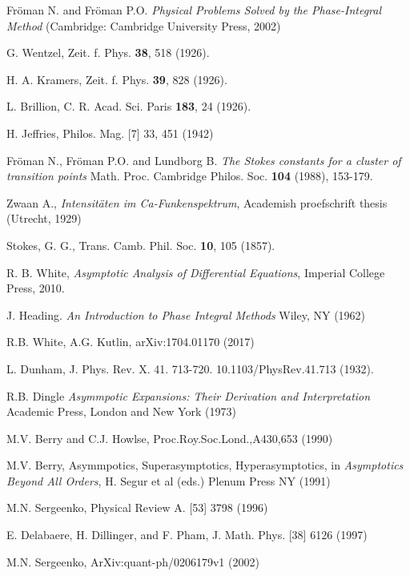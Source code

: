 \documentclass[atmp]{ipart_v1}
\begin{document}
\begin{thebibliography}{30}

 Fr\"oman N. and Fr\"oman P.O. \textit{Physical Problems Solved by the Phase-Integral Method} (Cambridge: Cambridge University Press, 2002)

 G. Wentzel, Zeit. f. Phys. \textbf{38}, 518 (1926).

 H. A. Kramers, Zeit. f. Phys. \textbf{39}, 828 (1926).

 L. Brillion, C. R. Acad. Sci. Paris \textbf{183}, 24 (1926).

 H. Jeffries, Philos. Mag. [7] 33, 451 (1942)

 Fr\"oman N., Fr\"oman P.O. and Lundborg B. \textit{The Stokes constants for a cluster of transition
points} Math. Proc. Cambridge Philos. Soc. \textbf{104} (1988), 153-179.

 Zwaan A., \textit{Intensit\"aten im Ca-Funkenspektrum}, Academish proefschrift thesis (Utrecht, 1929)

 Stokes, G. G., Trans. Camb. Phil. Soc. \textbf{10}, 105 (1857).

 R. B. White,
 {\it Asymptotic Analysis of Differential Equations}, Imperial College Press, 2010.

 J. Heading. {\it An Introduction to Phase Integral Methods} 
Wiley, NY (1962)

 R.B. White, A.G. Kutlin, arXiv:1704.01170 (2017)

 L. Dunham, J. Phys. Rev. X. 41. 713-720. 10.1103/PhysRev.41.713 (1932).
 
 R.B. Dingle {\it Asymmpotic Expansions: Their Derivation and 
Interpretation} Academic Press, London and New York (1973)

 M.V. Berry and C.J. Howlse, Proc.Roy.Soc.Lond.,A430,653 (1990)

 M.V. Berry, Asymmpotics, Superasymptotics,
 Hyperasymptotics, in {\it Asymptotics Beyond All Orders}, H. Segur et al (eds.) Plenum Press NY (1991)

 M.N. Sergeenko, Physical Review A. [53] 3798 (1996)

 E. Delabaere, H. Dillinger, and F. Pham, J. Math. Phys. [38] 6126 (1997)

 M.N. Sergeenko, ArXiv:quant-ph/0206179v1 (2002)


\end{thebibliography}
\end{document}
